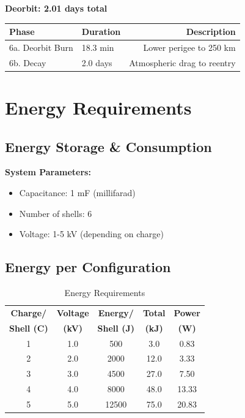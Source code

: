 \documentclass[11pt,a4paper]{article}
\begin{document}
\textbf{Deorbit: 2.01 days total}

\begin{table}[h!]
\centering
\begin{tabular}{llr}
\toprule
\textbf{Phase} & \textbf{Duration} & \textbf{Description} \\
\midrule
6a. Deorbit Burn & 18.3 min & Lower perigee to 250 km \\
6b. Decay & 2.0 days & Atmospheric drag to reentry \\
\bottomrule
\end{tabular}
\end{table}

\section{Energy Requirements}

\subsection{Energy Storage \& Consumption}

\textbf{System Parameters:}
\begin{itemize}[leftmargin=*]
    \item Capacitance: 1 mF (millifarad)
    \item Number of shells: 6
    \item Voltage: 1-5 kV (depending on charge)
\end{itemize}

\subsection{Energy per Configuration}

\begin{table}[h!]
\centering
\caption{Energy Requirements}
\label{tab:energy}
\begin{tabular}{ccccc}
\toprule
\textbf{Charge/} & \textbf{Voltage} & \textbf{Energy/} & \textbf{Total} & \textbf{Power} \\
\textbf{Shell (C)} & \textbf{(kV)} & \textbf{Shell (J)} & \textbf{(kJ)} & \textbf{(W)} \\
\midrule
1 & 1.0 & 500 & 3.0 & 0.83 \\
2 & 2.0 & 2000 & 12.0 & 3.33 \\
3 & 3.0 & 4500 & 27.0 & 7.50 \\
4 & 4.0 & 8000 & 48.0 & 13.33 \\
5 & 5.0 & 12500 & 75.0 & 20.83 \\
\bottomrule
\end{tabular}
\end{table}
\end{document}
